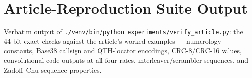 \section{Article-Reproduction Suite Output}
\label{app:verify}

Verbatim output of
\texttt{./venv/bin/python experiments/verify\_article.py}: the 44
bit-exact checks against the article's worked examples --- numerology
constants, Base38 callsign and QTH-locator encodings, CRC-8/CRC-16
values, convolutional-code outputs at all four rates,
interleaver/scrambler sequences, and Zadoff--Chu sequence properties.


